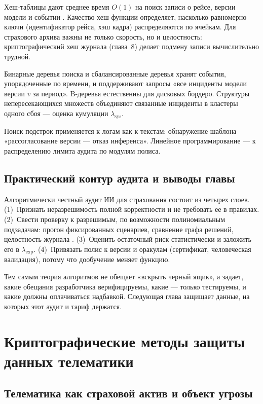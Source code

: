 \documentclass[a4paper,14pt]{extarticle}
\begin{document}
Хеш-таблицы дают среднее время $O(1)$ на поиск записи о рейсе, версии модели и событии \cite{cormen}. Качество хеш-функции определяет, насколько равномерно ключи (идентификатор рейса, хэш кадра) распределяются по ячейкам. Для страхового архива важны не только скорость, но и целостность: криптографический хеш журнала (глава~8) делает подмену записи вычислительно трудной.

Бинарные деревья поиска и сбалансированные деревья \cite{cormen} хранят события, упорядоченные по времени, и поддерживают запросы «все инциденты модели версии $v$ за период». B-деревья естественны для дисковых бордеро. Структуры непересекающихся множеств объединяют связанные инциденты в кластеры одного сбоя --- оценка кумуляции $\lambda_{\mathrm{sys}}$.

Поиск подстрок \cite{cormen} применяется к логам как к текстам: обнаружение шаблона «рассогласование версии --- отказ инференса». Линейное программирование --- к распределению лимита аудита по модулям полиса.

\subsection{Практический контур аудита и выводы главы}

Алгоритмически честный аудит ИИ для страхования состоит из четырех слоев. (1)~Признать неразрешимость полной корректности \cite{vereshchagin} и не требовать ее в правилах. (2)~Свести проверку к разрешимым, по возможности полиномиальным подзадачам: прогон фиксированных сценариев, сравнение графа решений, целостность журнала \cite{cormen}. (3)~Оценить остаточный риск статистически и заложить его в $\lambda_{\mathrm{exp}}$. (4)~Привязать полис к версии и оракулам (сертификат, человеческая валидация), потому что дообучение меняет функцию.

Тем самым теория алгоритмов не обещает «вскрыть черный ящик», а задает, какие обещания разработчика верифицируемы, какие --- только тестируемы, и какие должны оплачиваться надбавкой. Следующая глава защищает данные, на которых этот аудит и тариф держатся.

\section{Криптографические методы защиты данных телематики}

\subsection{Телематика как страховой актив и объект угрозы}
\end{document}
